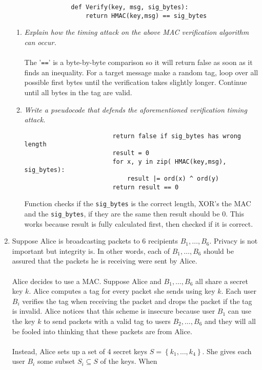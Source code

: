 \documentclass[a4paper]{article}
\begin{document}
\begin{enumerate}
\begin{verbatim}
				def Verify(key, msg, sig_bytes):
				    return HMAC(key,msg) == sig_bytes
			\end{verbatim}
			\begin{enumerate}
				\item \textit{\emph{Explain how the timing attack on the above MAC
					verification algorithm can occur.}}\\
					\\
					The '\verb|==|' is a byte-by-byte comparison so it will return
					false as soon as it finds an inequality. For a target message
					make a random tag, loop over all possible first bytes until
					the verification takes slightly longer. Continue until all
					bytes in the tag are valid.
				\item \textit{\emph{Write a pseudocode that defends the aforementioned
					verification timing attack.}}
					\begin{verbatim}
						return false if sig_bytes has wrong length
						result = 0
						for x, y in zip( HMAC(key,msg), sig_bytes):
						    result |= ord(x) ^ ord(y)
						return result == 0
					\end{verbatim}
					Function checks if the \verb|sig_bytes| is the correct length,
					XOR's the MAC and the \verb|sig_bytes|, if they are the same
					then result should be 0. This works because result is fully
					calculated first, then checked if it is correct.
			\end{enumerate}
		\item Suppose Alice is broadcasting packets to 6 recipients $B_1,\ldots,B_6$. Privacy
			is not important but integrity is. In other words, each of $B_1,\ldots,B_6$ 
			should be assured that the packets he is receiving were sent by Alice.\\
			\\
			Alice decides to use a MAC. Suppose Alice and $B_1,\ldots,B_6$ all share
			a secret key $k$. Alice computes a tag for every packet she sends using
			key $k$. Each user $B_i$ verifies the tag when receiving the packet and
			drops the packet if the tag is invalid. Alice notices that this scheme is
			insecure because user $B_1$ can use the key $k$ to send packets with a
			valid tag to users $B_2,\ldots,B_6$ and they will all be fooled into
			thinking that these packets are from Alice.\\
			\\
			Instead, Alice sets up a set of 4 secret keys $S=\left\{ k_1,\ldots,k_4 \right\} $.
			She gives each user $B_i$ some subset $S_i \subseteq S$ of the keys. When

\end{enumerate}
\end{document}
